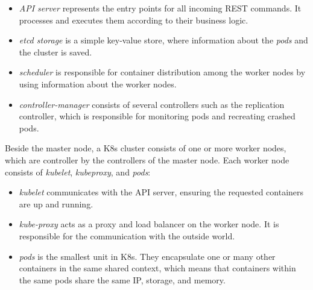 \begin{itemize}
	\item \textit{API server} represents the entry points for all incoming REST commands. It processes and executes them according to their business logic.
	\item \textit{etcd storage} is a simple key-value store, where information about the \textit{pods} and the cluster is saved.
	\item \textit{scheduler} is responsible for container distribution among the worker nodes by using information about the worker nodes. 
	\item \textit{controller-manager} consists of several controllers such as the replication controller, which is responsible for monitoring pods and recreating crashed pods.
\end{itemize}
Beside the master node, a K8s cluster consists of one or more worker nodes, which are controller by the controllers of the master node. Each worker node consists of \textit{kubelet}, \textit{kubeproxy}, and \textit{pods}:

\begin{itemize}
	\item \textit{kubelet} communicates with the API server, ensuring the requested containers are up and running.
	\item \textit{kube-proxy} acts as a proxy and load balancer on the worker node. It is responsible for the communication with the outside world.
	\item \textit{pods} is the smallest unit in K8s. They encapsulate one or many other containers in the same shared context, which means that containers within the same pods share the same IP, storage, and memory.
\end{itemize}
